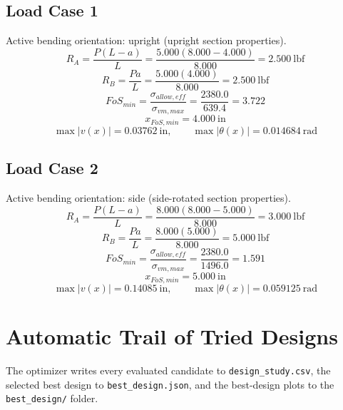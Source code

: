 \documentclass[11pt]{article}
\begin{document}
\subsection*{Load Case 1}
Active bending orientation: upright (upright section properties).
\[R_A = \frac{P(L-a)}{L} = \frac{5.000(8.000-4.000)}{8.000} = 2.500\ \mathrm{lbf}\]
\[R_B = \frac{Pa}{L} = \frac{5.000(4.000)}{8.000} = 2.500\ \mathrm{lbf}\]
\[FoS_{min} = \frac{\sigma_{allow,eff}}{\sigma_{vm,max}} = \frac{2380.0}{639.4} = 3.722\]
\[x_{FoS,min} = 4.000\ \mathrm{in}\]
\[\max |v(x)| = 0.03762\ \mathrm{in}, \qquad \max |\theta(x)| = 0.014684\ \mathrm{rad}\]
\subsection*{Load Case 2}
Active bending orientation: side (side-rotated section properties).
\[R_A = \frac{P(L-a)}{L} = \frac{8.000(8.000-5.000)}{8.000} = 3.000\ \mathrm{lbf}\]
\[R_B = \frac{Pa}{L} = \frac{8.000(5.000)}{8.000} = 5.000\ \mathrm{lbf}\]
\[FoS_{min} = \frac{\sigma_{allow,eff}}{\sigma_{vm,max}} = \frac{2380.0}{1496.0} = 1.591\]
\[x_{FoS,min} = 5.000\ \mathrm{in}\]
\[\max |v(x)| = 0.14085\ \mathrm{in}, \qquad \max |\theta(x)| = 0.059125\ \mathrm{rad}\]

\section*{Automatic Trail of Tried Designs}
The optimizer writes every evaluated candidate to \texttt{design\_study.csv}, the selected best design to \texttt{best\_design.json}, and the best-design plots to the \texttt{best\_design/} folder.
\end{document}
